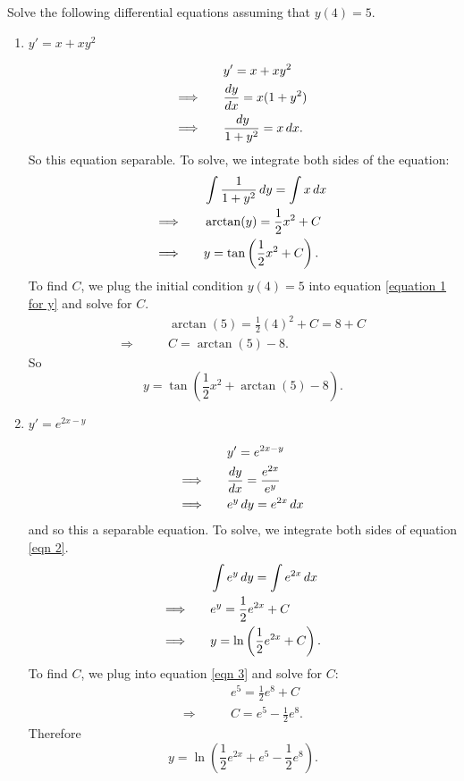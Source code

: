 \documentclass[noinstructornotes]{ximera}
\begin{document}
\begin{problem}
Solve the following differential equations assuming that $y(4)=5$.
	\begin{enumerate}

	
	
	
	\item 	$y'=x+xy^2$
	\begin{freeResponse}
		\begin{align*}
		&y' = x+xy^2  \\
		\Longrightarrow 	\qquad	&\dd[y]{x} = x(1+y^2)  \\
		\Longrightarrow 	\qquad	&\frac{\d y}{1+y^2} = x \d x.
		\end{align*}
	So this equation  separable.
	To solve, we integrate both sides of the equation:
		\begin{align}
		&\int \frac{1}{1+y^2} \d y = \int x \d x  \nonumber \\
		\Longrightarrow 	\qquad	&\arctan(y) = \frac{1}{2} x^2 + C  \label{equation 1 for y}\\
		\Longrightarrow 	\qquad	&y = \tan \left( \frac{1}{2} x^2 + C \right).  \nonumber
		\end{align}
	To find $C$, we plug the initial condition $y(4) = 5$ into equation \eqref{equation 1 for y} and solve for $C$.
		\begin{align*}
		&\arctan(5) = \frac{1}{2} (4)^2 + C = 8 + C  \\
		\Longrightarrow 	\qquad	&C = \arctan(5) - 8.
		\end{align*}
	So
		\[
		y = \tan \left( \frac{1}{2} x^2 + \arctan(5) - 8 \right).
		\]
	\end{freeResponse}
	
	
	
	\item 	$y' = e^{2x-y}$
	\begin{freeResponse}
		\begin{align}
		&y' = e^{2x-y}  \nonumber \\
		\Longrightarrow 	\qquad	&\dd[y]{x} = \frac{e^{2x}}{e^y}  \nonumber \\
		\Longrightarrow 	\qquad	&e^y \d y = e^{2x} \d x  \label{eqn 2}
		\end{align}
	and so this  a separable equation.  
	To solve, we integrate both sides of equation \eqref{eqn 2}.
		\begin{align}
		&\int e^y \d y = \int e^{2x} \d x  \nonumber  \\
		\Longrightarrow 	\qquad	&e^y = \frac{1}{2} e^{2x} + C  \label{eqn 3}  \\
		\Longrightarrow 	\qquad	&y = \ln \left( \frac{1}{2} e^{2x} + C \right).  \nonumber
		\end{align}
	To find $C$, we plug into equation \eqref{eqn 3} and solve for $C$:
		\begin{align*}
		&e^5 = \frac{1}{2} e^8 + C  \\
		\Longrightarrow 	\qquad	&C = e^5 - \frac{1}{2} e^8.
		\end{align*}
	Therefore
		\[
		y = \ln \left( \frac{1}{2} e^{2x} + e^5 - \frac{1}{2}e^8 \right).
		\]
	\end{freeResponse}
	\end{enumerate}
	

\end{problem}
\end{document}
